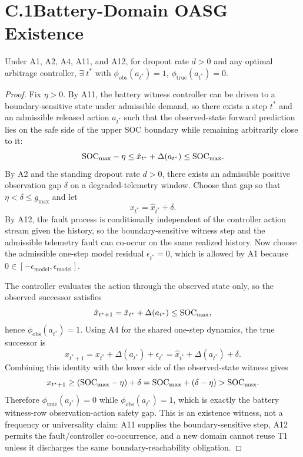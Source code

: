 \section{C.1\quad Battery-Domain OASG Existence}\label{sec:proof-oasg}
\begin{theorem}[restated]
Under A1, A2, A4, A11, and A12, for dropout rate $d>0$ and any optimal
arbitrage controller, $\exists\;t^*$ with $\phi_{\mathrm{obs}}(a_{t^*})=1$,
$\phi_{\mathrm{true}}(a_{t^*})=0$.
\end{theorem}
\begin{proof}
Fix $\eta>0$.  By A11, the battery witness controller can be driven to a
boundary-sensitive state under admissible demand, so there exists a step $t^*$
and an admissible released action $a_{t^*}$ such that the observed-state
forward prediction lies on the safe side of the upper SOC boundary while
remaining arbitrarily close to it:
\[
  \mathrm{SOC}_{\max}-\eta
  \le
  \hat{x}_{t^*} + \Delta(a_{t^*})
  \le
  \mathrm{SOC}_{\max}.
\]
By A2 and the standing dropout rate $d>0$, there exists an admissible
positive observation gap $\delta$ on a degraded-telemetry window.  Choose that
gap so that $\eta<\delta\le g_{\max}$ and let
\[
  x_{t^*} = \hat{x}_{t^*} + \delta.
\]
By A12, the fault process is conditionally independent of the controller
action stream given the history, so the boundary-sensitive witness step and
the admissible telemetry fault can co-occur on the same realized history.
Now choose the admissible one-step model residual $\epsilon_{t^*}=0$, which is
allowed by A1 because $0\in[-\epsilon_{\mathrm{model}},\epsilon_{\mathrm{model}}]$.

The controller evaluates the action through the observed state only, so the
observed successor satisfies
\[
  \hat{x}_{t^*+1}
  =
  \hat{x}_{t^*} + \Delta(a_{t^*})
  \le
  \mathrm{SOC}_{\max},
\]
hence $\phi_{\mathrm{obs}}(a_{t^*})=1$.  Using A4 for the shared one-step
dynamics, the true successor is
\[
  x_{t^*+1}
  =
  x_{t^*} + \Delta(a_{t^*}) + \epsilon_{t^*}
  =
  \hat{x}_{t^*} + \Delta(a_{t^*}) + \delta.
\]
Combining this identity with the lower side of the observed-state witness
gives
\[
  x_{t^*+1}
  \ge
  (\mathrm{SOC}_{\max}-\eta) + \delta
  =
  \mathrm{SOC}_{\max} + (\delta-\eta)
  >
  \mathrm{SOC}_{\max}.
\]
Therefore $\phi_{\mathrm{true}}(a_{t^*})=0$ while
$\phi_{\mathrm{obs}}(a_{t^*})=1$, which is exactly the battery witness-row
observation-action safety gap.  This is an existence witness, not a frequency
or universality claim: A11 supplies the boundary-sensitive step, A12 permits
the fault/controller co-occurrence, and a new domain cannot reuse T1 unless it
discharges the same boundary-reachability obligation.  \qedhere
\end{proof}

